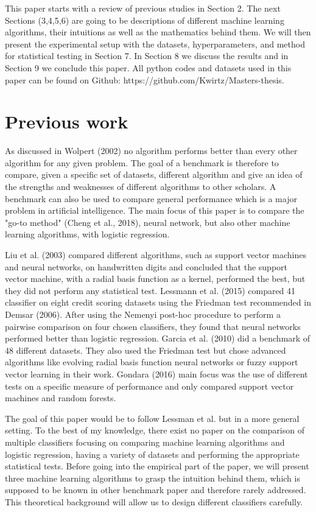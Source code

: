\documentclass[a4paper,12pt]{article}
\numberwithin{equation}{section}
\begin{document}
This paper starts with a review of previous studies in Section 2. The next Sections (3,4,5,6) are going to be descriptions of different machine learning algorithms, their intuitions as well as the mathematics behind them. We will then present the experimental setup with the datasets, hyperparameters, and method for statistical testing in Section 7. In Section 8 we discuss the results and in Section 9 we conclude this paper. All python codes and datasets used in this paper can be found on Github: https://github.com/Kwirtz/Masters-thesis.

\newpage

\section{Previous work}

As discussed in Wolpert (2002) no algorithm performs better than every other algorithm for any given problem. The goal of a benchmark is therefore to compare, given a specific set of datasets, different algorithm and give an idea of the strengths and weaknesses of different algorithms to other scholars. A benchmark can also be used to compare general performance which is a major problem in artificial intelligence. The main focus of this paper is to compare the "go-to method" (Cheng et al., 2018), neural network, but also other machine learning algorithms, with logistic regression. \par
Liu et al. (2003) compared different algorithms, such as support vector machines and neural networks, on handwritten digits and concluded that the support vector machine, with a radial basis function as a kernel, performed the best, but they did not perform any statistical test. Lessmann et al. (2015) compared 41 classifier on eight credit scoring datasets using the Friedman test recommended in Demsar (2006). After using the Nemenyi post-hoc procedure to perform a pairwise comparison on four chosen classifiers, they found that neural networks performed better than logistic regression. Garcia et al. (2010) did a benchmark of 48 different datasets. They also used the Friedman test but chose advanced algorithms like evolving radial basis function neural networks or fuzzy support vector learning in their work. Gondara (2016) main focus was the use of different tests on a specific measure of performance and only compared support vector machines and random forests. \par
The goal of this paper would be to follow Lessman et al. but in a more general setting. To the best of my knowledge, there exist no paper on the comparison of multiple classifiers focusing on comparing machine learning algorithms and logistic regression, having a variety of datasets and performing the appropriate statistical tests. Before going into the empirical part of the paper, we will present three machine learning algorithms to grasp the intuition behind them, which is supposed to be known in other benchmark paper and therefore rarely addressed. This theoretical background will allow us to design different classifiers carefully.
\end{document}
